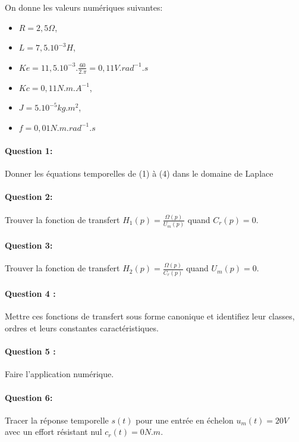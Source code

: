 On donne les valeurs numériques suivantes:\\
\begin{minipage}{0.45\linewidth}
\begin{itemize}
 \item $R=2,5\Omega$,
 \item $L=7,5.10^{-3}H$,
 \item $Ke=11,5.10^{-3}.\frac{60}{2.\pi}=0,11 V.rad^{-1}.s$
\end{itemize}
\end{minipage}\hfill
\begin{minipage}{0.45\linewidth}
\begin{itemize}
 \item $Kc=0,11N.m.A^{-1}$,
 \item $J=5.10^{-5}kg.m^2$,
 \item $f=0,01N.m.rad^{-1}.s$
\end{itemize}
\end{minipage}

\paragraph{Question 1:} Donner les équations temporelles de (1) à (4) dans le domaine de Laplace

\paragraph{Question 2:} Trouver la fonction de transfert $H_1(p)=\frac{\Omega(p)}{U_m(p)}$ quand $C_r(p)=0$.

\paragraph{Question 3:} Trouver la fonction de transfert $H_2(p)=\frac{\Omega(p)}{C_r(p)}$ quand $U_m(p)=0$.

\paragraph{Question 4 :} Mettre ces fonctions de transfert sous forme canonique et identifiez leur classes, ordres et leurs constantes caractéristiques.

\paragraph{Question 5 :} Faire l'application numérique.

\paragraph{Question 6:} Tracer la réponse temporelle $s(t)$ pour une entrée en échelon $u_m(t)=20V$ avec un effort résistant nul $c_r(t)=0N.m$.

